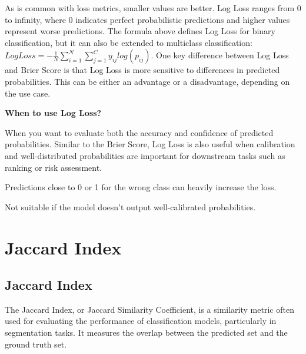 As is common with loss metrics, smaller values are better. Log Loss ranges from 0 to infinity, where 0 indicates perfect probabilistic predictions and higher values
represent worse predictions. The formula above defines Log Loss for binary classification, but it can also be extended to multiclass classification:  
$Log Loss = -\frac{1}{N} \sum_{i=1}^{N} \sum_{j=1}^{C} y_{ij} log(p_{ij})$.
One key difference between Log Loss and Brier Score is that Log Loss is more sensitive to differences in predicted probabilities. This can be either an advantage or a
disadvantage, depending on the use case.


\textbf{When to use Log Loss?}

When you want to evaluate both the accuracy and confidence of predicted probabilities. Similar to the Brier Score, Log Loss is also useful when calibration
and well-distributed probabilities are important for downstream tasks such as ranking or risk assessment.

{
    \item Predictions close to 0 or 1 for the wrong class can heavily increase the loss.
    \item Not suitable if the model doesn't output well-calibrated probabilities.
}

\clearpage
\thispagestyle{classificationstyle}
\section{Jaccard Index}
\subsection{Jaccard Index}

The Jaccard Index, or Jaccard Similarity Coefficient, is a similarity metric often used for evaluating the performance of classification models,
particularly in segmentation tasks.  It measures the overlap between the predicted set and the ground truth set.

\begin{center}
\end{center}

